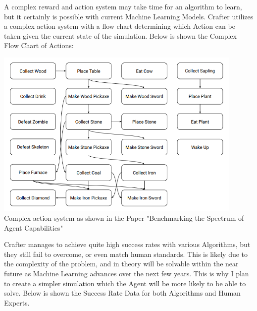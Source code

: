 \begin{flushleft}
                        \vspace{0.2cm}

                        A complex reward and action system may take time for an algorithm to learn, but it certainly is possible with current
                        Machine Learning Models. Crafter utilizes a complex action system with a flow chart determining which Action can be taken
                        given the current state of the simulation. Below is shown the Complex Flow Chart of Actions: \\

                        \vspace{0.2cm}
                        \begin{center}
                            \includegraphics[width=12cm]{Images/InitialResearch/CrafterComplexActionSystem.PNG} \\
                            Complex action system as shown in the Paper "Benchmarking the Spectrum of Agent Capabilities" \\
                        \end{center}
                        \vspace{0.2cm}

                        Crafter manages to achieve quite high success rates with various Algorithms, but they still fail to overcome, or even match
                        human standards. This is likely due to the complexity of the problem, and in theory will be solvable within the near future
                        as Machine Learning advances over the next few years. This is why I plan to create a simpler simulation which the Agent will
                        be more likely to be able to solve. Below is shown the Success Rate Data for both Algorithms and Human Experts. \\


\end{flushleft}
